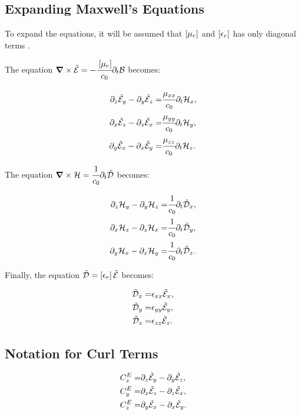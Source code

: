 \subsection{Expanding Maxwell's Equations}

To expand the equations, it will be assumed that $\brackets{\mu_r}$ and $\brackets{\epsilon_r}$ has only diagonal terms \cite{rumpf_book}. 

The equation $\rot \En = - \cfrac{\brackets{\mu_r}}{c_0} \partial _t \Bt$ becomes:

\begin{eqnarray}
    \partial_z\tilde{\mathcal{E}}_y - \partial_y\tilde{\mathcal{E}}_z =& \cfrac{\mu_{xx}}{c_0} \partial_t \mathcal{H}_x, \\
    \partial_x\tilde{\mathcal{E}}_z - \partial_z\tilde{\mathcal{E}}_x =& \cfrac{\mu_{yy}}{c_0} \partial_t \mathcal{H}_y,\\
    \partial_y\tilde{\mathcal{E}}_x - \partial_x\tilde{\mathcal{E}}_y =& \cfrac{\mu_{zz}}{c_0} \partial_t \mathcal{H}_z.
\end{eqnarray}

The equation $\bm{\nabla}\times \mathcal{H} = \cfrac{1}{c_0} \partial _t \tilde{\mathcal{D}}$ becomes:

\begin{eqnarray}
    \partial_z\mathcal{H}_y - \partial_y\mathcal{H}_z =& \cfrac{1}{c_0} \partial_t \tilde{\mathcal{D}}_x, \\
    \partial_x\mathcal{H}_z - \partial_z\mathcal{H}_x =& \cfrac{1}{c_0} \partial_t \tilde{\mathcal{D}}_y, \\
    \partial_y\mathcal{H}_x - \partial_x\mathcal{H}_y =& \cfrac{1}{c_0} \partial_t \tilde{\mathcal{D}}_z.
\end{eqnarray}

Finally, the equation $ \Dn = \brackets{\epsilon_r} \En $ becomes:

\begin{eqnarray}
    \tilde{\mathcal{D}}_x =& \epsilon_{xx} \tilde{\mathcal{E}}_x, \label{eq:Dn_x}\\
    \tilde{\mathcal{D}}_y =& \epsilon_{yy} \tilde{\mathcal{E}}_y, \label{eq:Dn_y}\\
    \tilde{\mathcal{D}}_z =& \epsilon_{zz} \tilde{\mathcal{E}}_z. \label{eq:Dn_z}
\end{eqnarray}

\subsection{Notation for Curl Terms}

\begin{eqnarray}
    C_x^E =& \partial_z\tilde{\mathcal{E}}_y - \partial_y\tilde{\mathcal{E}}_z, \\
    C_y^E =& \partial_x\tilde{\mathcal{E}}_z - \partial_z\tilde{\mathcal{E}}_x, \\
    C_z^E =& \partial_y\tilde{\mathcal{E}}_x - \partial_x\tilde{\mathcal{E}}_y.
\end{eqnarray}

